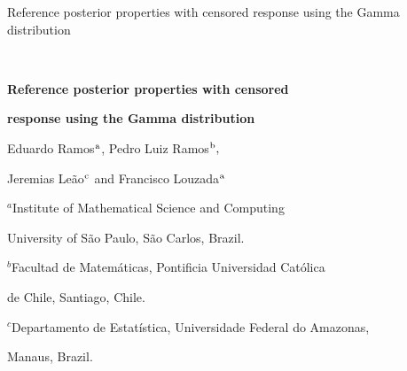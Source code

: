 \documentclass[12pt]{article} %
\theoremstyle{plain}%
\theoremstyle{definition}
\theoremstyle{remark}
\begin{document}

\renewcommand{\baselinestretch}{2}


{\hfill {\footnotesize\rm Reference posterior properties with censored response using the Gamma distribution} \hfill}

\renewcommand{\thefootnote}{}
$\ $\par


\fontsize{12}{14pt plus.8pt minus .6pt}\selectfont \vspace{0.8pc}
\centerline{\large\bf Reference posterior properties with censored} \centerline{\large\bf response using the Gamma distribution}
\vspace{.4cm} \centerline{Eduardo Ramos$^{\rm a}$, Pedro Luiz Ramos$^{\rm b},$} \centerline{Jeremias Leão$^{\rm c}$ and Francisco Louzada$^{\rm a}$}  
\vspace{.4cm} \centerline{$^{a}${Institute of Mathematical Science and Computing}} 
\vspace{-.2cm} \centerline{University of S\~ao Paulo, S\~ao Carlos, Brazil.} 
\vspace{.0cm} \centerline{$^{b}${Facultad de Matem\'aticas, Pontificia Universidad Cat\'olica }} 
\vspace{-.2cm} \centerline{  de Chile, Santiago, Chile.}  
\vspace{.0cm} \centerline{$^{c}${Departamento de Estat\'istica, Universidade Federal do Amazonas, }} 
\vspace{-.2cm} \centerline{ Manaus, Brazil.}\vspace{.55cm} \fontsize{9}{11.5pt plus.8pt minus
.6pt}\selectfont

\end{document}
